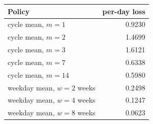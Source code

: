 \begin{tabular}{lr}
\toprule
Policy & per-day loss \\
\midrule
cycle mean, $m=1$ & 0.9230 \\
cycle mean, $m=2$ & 1.4699 \\
cycle mean, $m=3$ & 1.6121 \\
cycle mean, $m=7$ & 0.6338 \\
cycle mean, $m=14$ & 0.5980 \\
weekday mean, $w=2$ weeks & 0.2498 \\
weekday mean, $w=4$ weeks & 0.1247 \\
weekday mean, $w=8$ weeks & 0.0623 \\
\bottomrule
\end{tabular}
